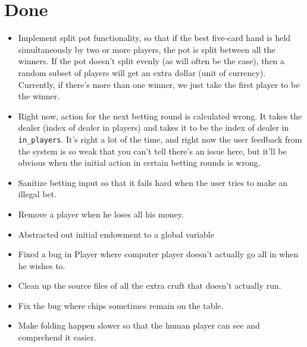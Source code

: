 \documentclass[10pt]{article}
\begin{document}
\section*{Done}
\begin{itemize}
\item \CheckedBox Implement split pot functionality, so that if the
  best five-card hand is held simultaneously by two or more players,
  the pot is split between all the winners. If the pot doesn't split
  evenly (as will often be the case), then a random subset of players
  will get an extra dollar (unit of currency). Currently, if there's
  more than one winner, we just take the first player to be the
  winner.
\item \CheckedBox Right now, action for the next betting round is
  calculated wrong. It takes the dealer (index of dealer in players)
  and takes it to be the index of dealer in \verb^in_players^. It's
  right a lot of the time, and right now the user feedback from the
  system is so weak that you can't tell there's an issue here, but
  it'll be obvious when the initial action in certain betting rounds
  is wrong.
\item \CheckedBox Sanitize betting input so that it fails hard when
  the user tries to make an illegal bet.
\item \CheckedBox Remove a player when he loses all his money.
\item \CheckedBox Abstracted out initial endowment to a global
  variable
\item \CheckedBox Fixed a bug in Player where computer player doesn't
  actually go all in when he wishes to.
\item \CheckedBox Clean up the source files of all the extra cruft
  that doesn't actually run.
\item \CheckedBox Fix the bug where chips sometimes remain on the table.
\item \CheckedBox Make folding happen slower so that the human player
  can see and comprehend it easier.
\end{itemize}
\end{document}
